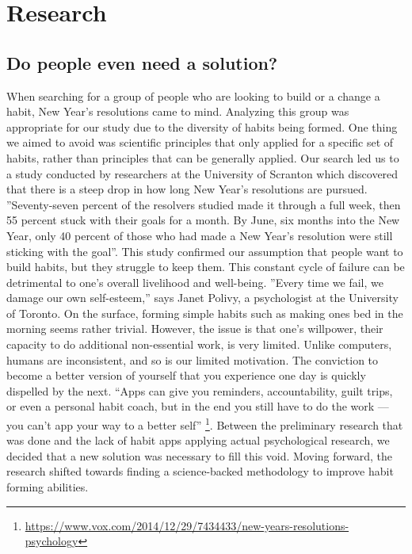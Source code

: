 \section{Research}
\subsection{Do people even need a solution?}
When searching for a group of people who are looking to build or a change a habit, New Year’s resolutions came to mind. Analyzing this group was appropriate for our study due to the diversity of habits being formed. One thing we aimed to avoid was scientific principles that only applied for a specific set of habits, rather than principles that can be generally applied. Our search led us to a study conducted by researchers at the University of Scranton which discovered that there is a steep drop in how long New Year’s resolutions are pursued. ”Seventy-seven percent of the resolvers studied made it through a full week, then 55 percent stuck with their goals for a month. By June, six months into the New Year, only 40 percent of those who had made a New Year’s resolution were still sticking with the goal”. This study confirmed our assumption that people want to build habits, but they struggle to keep them. This constant cycle of failure can be detrimental to one’s overall livelihood and well-being. ”Every time we fail, we damage our own self-esteem,” says Janet Polivy, a psychologist at the University of Toronto.
\newline \newline
On the surface, forming simple habits such as making ones bed in the morning seems rather trivial. However, the issue is that one’s willpower, their capacity to do additional non-essential work, is very limited. Unlike computers, humans are inconsistent, and so is our limited motivation. The conviction to become a better version of yourself that you experience one day is quickly dispelled by the next. “Apps can give you reminders, accountability, guilt trips, or even a personal habit coach, but in the end you still have to do the work — you can’t app your way to a better self”  \footnote{\url{https://www.vox.com/2014/12/29/7434433/new-years-resolutions-psychology}}.
Between the preliminary research that was done and the lack of habit apps applying actual psychological research, we decided that a new solution was necessary to fill this void. Moving forward, the research shifted towards finding a science-backed methodology to improve habit forming abilities.

